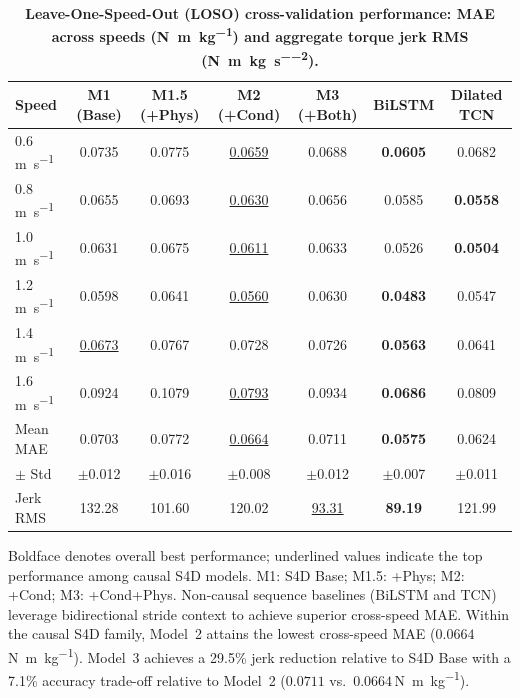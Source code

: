 \documentclass[fleqn,10pt]{wlscirep}
\newcommand{\Nmskg}{\si{\newton\metre\per\kilogram}}
\newcommand{\Nmskgsq}{\si{\newton\metre\per\kilogram\per\second\squared}}
\begin{document}
\begin{table}[ht]
\centering
\caption{\textbf{Leave-One-Speed-Out (LOSO) cross-validation performance: MAE across speeds (\Nmskg) and aggregate torque jerk RMS (\Nmskgsq).}}
\label{tab:loso}
\small
\setlength{\tabcolsep}{5pt}
\begin{tabular}{@{}l cccc cc@{}}
\toprule
\textbf{Speed} & \textbf{M1 (Base)} & \textbf{M1.5 (+Phys)} & \textbf{M2 (+Cond)} & \textbf{M3 (+Both)} & \textbf{BiLSTM} & \textbf{Dilated TCN} \\
\midrule
0.6\,\si{\metre\per\second} & 0.0735 & 0.0775 & \underline{0.0659} & 0.0688 & \textbf{0.0605} & 0.0682 \\
0.8\,\si{\metre\per\second} & 0.0655 & 0.0693 & \underline{0.0630} & 0.0656 & 0.0585 & \textbf{0.0558} \\
1.0\,\si{\metre\per\second} & 0.0631 & 0.0675 & \underline{0.0611} & 0.0633 & 0.0526 & \textbf{0.0504} \\
1.2\,\si{\metre\per\second} & 0.0598 & 0.0641 & \underline{0.0560} & 0.0630 & \textbf{0.0483} & 0.0547 \\
1.4\,\si{\metre\per\second} & \underline{0.0673} & 0.0767 & 0.0728 & 0.0726 & \textbf{0.0563} & 0.0641 \\
1.6\,\si{\metre\per\second} & 0.0924 & 0.1079 & \underline{0.0793} & 0.0934 & \textbf{0.0686} & 0.0809 \\
\midrule
Mean MAE & 0.0703 & 0.0772 & \underline{0.0664} & 0.0711 & \textbf{0.0575} & 0.0624 \\
$\pm$ Std & $\pm$0.012 & $\pm$0.016 & $\pm$0.008 & $\pm$0.012 & $\pm$0.007 & $\pm$0.011 \\
\midrule
Jerk RMS & 132.28 & 101.60 & 120.02 & \underline{93.31} & \textbf{89.19} & 121.99 \\
\bottomrule
\end{tabular}
\par\vspace{1.5mm}
{\raggedright\footnotesize Boldface denotes overall best performance; underlined values indicate the top performance among causal S4D models. M1: S4D Base; M1.5: +Phys; M2: +Cond; M3: +Cond+Phys. Non-causal sequence baselines (BiLSTM and TCN) leverage bidirectional stride context to achieve superior cross-speed MAE. Within the causal S4D family, Model~2 attains the lowest cross-speed MAE ($0.0664$\,\Nmskg{}). Model~3 achieves a 29.5\% jerk reduction relative to S4D Base with a 7.1\% accuracy trade-off relative to Model~2 ($0.0711$ vs.\ $0.0664$\,\Nmskg{}).\par}
\end{table}
\end{document}
